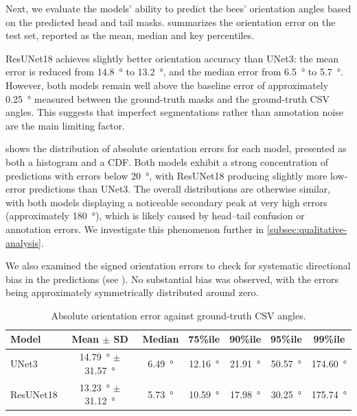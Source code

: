 Next, we evaluate the models’ ability to predict the bees’ orientation angles based on the predicted head and tail masks.
 summarizes the orientation error on the test set, reported as the mean, median and key percentiles.

ResUNet18 achieves slightly better orientation accuracy than UNet3: the mean error is reduced from \qty{14.8}{\degree} to \qty{13.2}{\degree}, and the median error from \qty{6.5}{\degree} to \qty{5.7}{\degree}.
However, both models remain well above the baseline error of approximately \qty{0.25}{\degree} measured between the ground-truth masks and the ground-truth CSV angles.
This suggests that imperfect segmentations rather than annotation noise are the main limiting factor.

 shows the distribution of absolute orientation errors for each model, presented as both a histogram and a CDF.
Both models exhibit a strong concentration of predictions with errors below \qty{20}{\degree}, with ResUNet18 producing slightly more low-error predictions than UNet3.
The overall distributions are otherwise similar, with both models displaying a noticeable secondary peak at very high errors (approximately \qty{180}{\degree}), which is likely caused by head–tail confusion or annotation errors.
We investigate this phenomenon further in \cref{subsec:qualitative-analysis}.

We also examined the signed orientation errors to check for systematic directional bias in the predictions (see ).
No substantial bias was observed, with the errors being approximately symmetrically distributed around zero.


\begin{table}[htbp]
    \centering
    \caption{Absolute orientation error against ground‑truth CSV angles.}
    \label{tab:orientation_results}
    \begin{tabular}{lcccccc}
        \toprule
        \textbf{Model} & \textbf{Mean $\pm$ SD}                          & \textbf{Median}     & \textbf{75\%ile}     & \textbf{90\%ile} & \textbf{95\%ile} & \textbf{99\%ile} \\
        \midrule
        UNet3          & \qty{14.79}{\degree} $\pm$ \qty{31.57}{\degree} & \qty{6.49}{\degree} & \qty{12.16}{\degree}   & \qty{21.91}{\degree}   & \qty{50.57}{\degree}   & \qty{174.60}{\degree}  \\
        ResUNet18      & \qty{13.23}{\degree} $\pm$ \qty{31.12}{\degree} & \qty{5.73}{\degree} & \qty{10.59}{\degree}   & \qty{17.98}{\degree}   & \qty{30.25}{\degree}   & \qty{175.74}{\degree}  \\
        \bottomrule
    \end{tabular}
\end{table}

